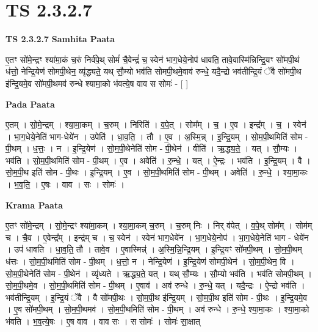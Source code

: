 \documentclass[17pt]{extarticle}
\begin{document}
\section{ TS 2.3.2.7 }

\textbf{TS 2.3.2.7 } \newline
\textbf{Samhita Paata} \newline

ए॒तꣳ सो॑मे॒न्द्रꣳ श्या॑मा॒कं च॒रुं निर्व॑पे॒थ् सोमं॑ चै॒वेन्द्रं॑ च॒ स्वेन॑ भाग॒धेये॒नोप॑ धावति॒ तावे॒वास्मि॑न्निन्द्रि॒यꣳ सो॑मपी॒थं ध॑त्तो॒ नेन्द्रि॒येण॑ सोमपी॒थेन॒ व्यृ॑द्ध्यते॒ यथ् सौ॒म्यो भव॑ति सोमपी॒थमे॒वाव॑ रुन्धे॒ यदै॒न्द्रो भव॑तीन्द्रि॒यं ॅवै सो॑मपी॒थ इ॑न्द्रि॒यमे॒व सो॑मपी॒थमव॑ रुन्धे श्यामा॒को भ॑वत्ये॒ष वाव स सोमः॑ - [  ] \newline

\textbf{Pada Paata} \newline

ए॒तम् । सो॒मे॒न्द्रम् । श्या॒मा॒कम् । च॒रुम् । निरिति॑ । व॒पे॒त् । सोम᳚म् । च॒ । ए॒व । इन्द्र᳚म् । च॒ । स्वेन॑ । भा॒ग॒धेये॒नेति॑ भाग-धेये॑न । उपेति॑ । धा॒व॒ति॒ । तौ । ए॒व । अ॒स्मि॒न्न् । इ॒न्द्रि॒यम् । सो॒म॒पी॒थमिति॑ सोम - पी॒थम् । ध॒त्तः॒ । न । इ॒न्द्रि॒येण॑ । सो॒म॒पी॒थेनेति॑ सोम - पी॒थेन॑ । वीति॑ । ऋ॒द्ध्य॒ते॒ । यत् । सौ॒म्यः । भव॑ति । सो॒म॒पी॒थमिति॑ सोम - पी॒थम् । ए॒व । अवेति॑ । रु॒न्धे॒ । यत् । ऐ॒न्द्रः । भव॑ति । इ॒न्द्रि॒यम् । वै । सो॒म॒पी॒थ इति॑ सोम - पी॒थः । इ॒न्द्रि॒यम् । ए॒व । सो॒म॒पी॒थमिति॑ सोम - पी॒थम् । अवेति॑ । रु॒न्धे॒ । श्या॒मा॒कः । भ॒व॒ति॒ । ए॒षः । वाव । सः । सोमः॑ ।  \newline


\textbf{Krama Paata} \newline

ए॒तꣳ सो॑मे॒न्द्रम् । सो॒मे॒न्द्रꣳ श्या॑मा॒कम् । श्या॒मा॒कम् च॒रुम् । च॒रुम् निः । निर् व॑पेत् । व॒पे॒थ् सोम᳚म् । सोम॑म् च । चै॒व । ए॒वेन्द्र᳚म् । इन्द्र॑म् च । च॒ स्वेन॑ । स्वेन॑ भाग॒धेये॑न । भा॒ग॒धेये॒नोप॑ । भा॒ग॒धेये॒नेति॑ भाग - धेये॑न । उप॑ धावति । धा॒व॒ति॒ तौ । तावे॒व । ए॒वास्मिन्न्॑ । अ॒स्मि॒न्नि॒न्द्रि॒यम् । इ॒न्द्रि॒यꣳ सो॑मपी॒थम् । सो॒म॒पी॒थम् ध॑त्तः । सो॒म॒पी॒थमिति॑ सोम - पी॒थम् । ध॒त्तो॒ न । नेन्द्रि॒येण॑ । इ॒न्द्रि॒येण॑ सोमपी॒थेन॑ । सो॒म॒पी॒थेन॒ वि । सो॒म॒पी॒थेनेति॑ सोम - पी॒थेन॑ । व्यृ॑ध्यते । ऋ॒द्ध्य॒ते॒ यत् । यथ् सौ॒म्यः । सौ॒म्यो भव॑ति । भव॑ति सोमपी॒थम् । सो॒म॒पी॒थमे॒व । सो॒म॒पी॒थमिति॑ सोम - पी॒थम् । ए॒वाव॑ । अव॑ रुन्धे । रु॒न्धे॒ यत् । यदै॒न्द्रः । ऐ॒न्द्रो भव॑ति । भव॑तीन्द्रि॒यम् । इ॒न्द्रि॒यं ॅवै । वै सो॑मपी॒थः । सो॒म॒पी॒थ इ॑न्द्रि॒यम् । सो॒म॒पी॒थ इति॑ सोम - पी॒थः । इ॒न्द्रि॒यमे॒व । ए॒व सो॑मपी॒थम् । सो॒म॒पी॒थमव॑ । सो॒म॒पी॒थमिति॑ सोम - पी॒थम् । अव॑ रुन्धे । रु॒न्धे॒ श्या॒मा॒कः । श्या॒मा॒को भ॑वति । भ॒व॒त्ये॒षः । ए॒ष वाव । वाव सः । स सोमः॑ । सोमः॑ सा॒क्षात् \newline
\end{document}
